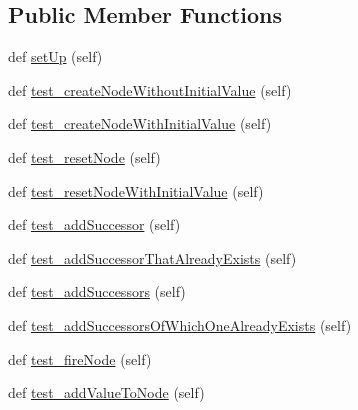 \subsection*{Public Member Functions}
\begin{DoxyCompactItemize}
\item 
def \hyperlink{classNEAT__PyGenetics_1_1NEAT_1_1Tests_1_1SimulationGenomeTests_1_1test__simulationNodes_1_1TestSimulationNode_a4f0dea64069a60e1044bea518e71eb2a}{set\+Up} (self)
\item 
def \hyperlink{classNEAT__PyGenetics_1_1NEAT_1_1Tests_1_1SimulationGenomeTests_1_1test__simulationNodes_1_1TestSimulationNode_a8e78e199d86083cfb7e2b24f8d749f53}{test\+\_\+create\+Node\+Without\+Initial\+Value} (self)
\item 
def \hyperlink{classNEAT__PyGenetics_1_1NEAT_1_1Tests_1_1SimulationGenomeTests_1_1test__simulationNodes_1_1TestSimulationNode_a946f16257d774eb20ebbc39ffbba80fe}{test\+\_\+create\+Node\+With\+Initial\+Value} (self)
\item 
def \hyperlink{classNEAT__PyGenetics_1_1NEAT_1_1Tests_1_1SimulationGenomeTests_1_1test__simulationNodes_1_1TestSimulationNode_a2204237f3ad2e72d386f5c58a6a66718}{test\+\_\+reset\+Node} (self)
\item 
def \hyperlink{classNEAT__PyGenetics_1_1NEAT_1_1Tests_1_1SimulationGenomeTests_1_1test__simulationNodes_1_1TestSimulationNode_a83849a9e57a26f12bd9512d726169155}{test\+\_\+reset\+Node\+With\+Initial\+Value} (self)
\item 
def \hyperlink{classNEAT__PyGenetics_1_1NEAT_1_1Tests_1_1SimulationGenomeTests_1_1test__simulationNodes_1_1TestSimulationNode_ae62c393e1902601513fc583afc76cc26}{test\+\_\+add\+Successor} (self)
\item 
def \hyperlink{classNEAT__PyGenetics_1_1NEAT_1_1Tests_1_1SimulationGenomeTests_1_1test__simulationNodes_1_1TestSimulationNode_aab4bc7e936bf62a62a3103528f3dc4ef}{test\+\_\+add\+Successor\+That\+Already\+Exists} (self)
\item 
def \hyperlink{classNEAT__PyGenetics_1_1NEAT_1_1Tests_1_1SimulationGenomeTests_1_1test__simulationNodes_1_1TestSimulationNode_a60e903a3c955ac9fe7245f8dc9df81f7}{test\+\_\+add\+Successors} (self)
\item 
def \hyperlink{classNEAT__PyGenetics_1_1NEAT_1_1Tests_1_1SimulationGenomeTests_1_1test__simulationNodes_1_1TestSimulationNode_a5db57231e1465f7659a5875e7ca4bf8e}{test\+\_\+add\+Successors\+Of\+Which\+One\+Already\+Exists} (self)
\item 
def \hyperlink{classNEAT__PyGenetics_1_1NEAT_1_1Tests_1_1SimulationGenomeTests_1_1test__simulationNodes_1_1TestSimulationNode_aba98791f76639d8e17987dfbfd544ce2}{test\+\_\+fire\+Node} (self)
\item 
def \hyperlink{classNEAT__PyGenetics_1_1NEAT_1_1Tests_1_1SimulationGenomeTests_1_1test__simulationNodes_1_1TestSimulationNode_a9bd84563b74b73f13f5578c7373ec6a8}{test\+\_\+add\+Value\+To\+Node} (self)
\end{DoxyCompactItemize}
